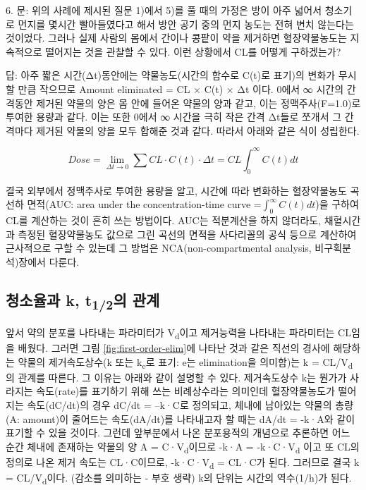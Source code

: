 \documentclass[
  11pt,
  krantz2, a4paper, twoside]{krantz}
\makeatletter
\newenvironment{kframe}{%
\medskip{}
\setlength{\fboxsep}{.8em}
 \def\at@end@of@kframe{}%
 \ifinner\ifhmode%
  \def\at@end@of@kframe{\end{minipage}}%
  \begin{minipage}{\columnwidth}%
 \fi\fi%
 \def\FrameCommand##1{\hskip\@totalleftmargin \hskip-\fboxsep
 \colorbox{shadecolor}{##1}\hskip-\fboxsep
     \hskip-\linewidth \hskip-\@totalleftmargin \hskip\columnwidth}%
 \MakeFramed {\advance\hsize-\width
   \@totalleftmargin\z@ \linewidth\hsize
   \@setminipage}}%
 {\par\unskip\endMakeFramed%
 \at@end@of@kframe}
\newenvironment{rmdblock}[1]
  {
  \begin{itemize}
  \renewcommand{\labelitemi}{
    \raisebox{-.7\height}[0pt][0pt]{
      {\setkeys{Gin}{width=3em,keepaspectratio}\texttt{[image: images/\#1]}}
    }
  }
  \setlength{\fboxsep}{1em}
  \begin{kframe}
  \item
  }
  {
  \end{kframe}
  \end{itemize}
  }
\newenvironment{rmdtip}
  {\begin{rmdblock}{tip}}
  {\end{rmdblock}}
\theoremstyle{definition}
\theoremstyle{definition}
\theoremstyle{definition}
\theoremstyle{definition}
\theoremstyle{remark}
\makeatother
\begin{document}
\begin{rmdtip}
6. 문: 위의 사례에 제시된 질문 1)에서 5)를 풀 때의 가정은 방이 아주 넓어서 청소기로 먼지를 몇시간 빨아들였다고 해서 방안 공기 중의 먼지 농도는 전혀 변치 않는다는 것이었다. 그러나 실제 사람의 몸에서 간이나 콩팥이 약을 제거하면 혈장약물농도는 지속적으로 떨어지는 것을 관찰할 수 있다. 이런 상황에서 CL를 어떻게 구하겠는가?

답: 아주 짧은 시간(Δt)동안에는 약물농도(시간의 함수로 C(t)로 표기)의
변화가 무시할 만큼 작으므로 Amount eliminated = CL × C(t) × Δt 이다.
0에서 ∞ 시간의 간격동안 제거된 약물의 양은 몸 안에 들어온 약물의 양과
같고, 이는 정맥주사(F=1.0)로 투여한 용량과 같다. 이는 또한 0에서 ∞
시간을 극히 작은 간격 Δt들로 쪼개서 그 간격마다 제거된 약물의 양을
모두 합해준 것과 같다. 따라서 아래와 같은 식이 성립한다.

\[
Dose = \lim_{\Delta t \rightarrow 0}{\sum_{}^{}{CL \cdot C\left( t \right) \cdot \Delta t = CL\int_{0}^{\infty}{C\left( t \right)dt}}}
\]

결국 외부에서 정맥주사로 투여한 용량을 알고, 시간에 따라 변화하는 혈장약물농도 곡선하 면적(AUC: area under the concentration-time curve =\(\int_{0}^{\infty}{C\left( t \right){dt}}\))을 구하여 CL를 계산하는 것이 흔히 쓰는 방법이다.
AUC는 적분계산을 하지 않더라도, 채혈시간과 측정된 혈장약물농도 값으로 그린 곡선의 면적을 사다리꼴의 공식 등으로 계산하여 근사적으로 구할 수 있는데 그 방법은 NCA(non-compartmental analysis, 비구획분석)장에서 다룬다.
\end{rmdtip}

\hypertarget{uxccaduxc18cuxc728uxacfc-k-t12uxc758-uxad00uxacc4}{%
\subsection{\texorpdfstring{청소율과 k, t\textsubscript{1/2}의 관계}{청소율과 k, t1/2의 관계}}\label{uxccaduxc18cuxc728uxacfc-k-t12uxc758-uxad00uxacc4}}

앞서 약의 분포를 나타내는 파라미터가 V\textsubscript{d}이고 제거능력을 나타내는 파라미터는 CL임을 배웠다.
그러면 그림 \ref{fig:first-order-elim}에 나타난 것과 같은 직선의 경사에 해당하는 약물의 제거속도상수(k 또는 k\textsubscript{e}로 표기: e는 elimination을 의미함)는 k = CL/V\textsubscript{d}의 관계를 따른다.
그 이유는 아래와 같이 설명할 수 있다.
제거속도상수 k는 뭔가가 사라지는 속도(rate)를 표기하기 위해 쓰는 비례상수라는 의미인데 혈장약물농도가 떨어지는 속도(dC/dt)의 경우 dC/dt = --k·C로 정의되고, 체내에 남아있는 약물의 총량(A: amount)이 줄어드는 속도(dA/dt)를 나타내고자 할 때는 dA/dt = -k·A와 같이 표기할 수 있을 것이다. 그런데 앞부분에서 나온 분포용적의 개념으로 추론하면 어느 순간 체내에 존재하는 약물의 양 A = C·V\textsubscript{d}이므로 -k·A = -k·C·V\textsubscript{d} 이고 또 CL의 정의로 나온 제거 속도는 CL·C이므로, -k·C·V\textsubscript{d} = CL·C가 된다. 
그러므로 결국 k = CL/V\textsubscript{d}이다. (감소를 의미하는 - 부호 생략) k의 단위는 시간의 역수(1/h)가 된다.
\end{document}
